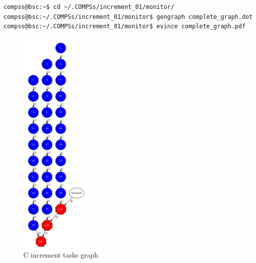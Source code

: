 \begin{lstlisting}[language=bash]
compss@bsc:~$ cd ~/.COMPSs/increment_01/monitor/
compss@bsc:~/.COMPSs/increment_01/monitor$ gengraph complete_graph.dot
compss@bsc:~/.COMPSs/increment_01/monitor$ evince complete_graph.pdf
\end{lstlisting}

\begin{figure}[ht!]
  \centering
    \includegraphics[width=0.3\textwidth]{./Sections/4_C/Figures/increment_graph.jpeg}
    \caption{C increment tasks graph} 
    \label{fig:increment_c}
\end{figure}

\newpage
~
